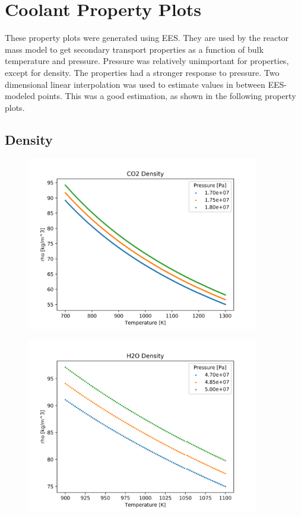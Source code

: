 \chapter{Coolant Property Plots}\label{ch:appendix-b}

These property plots were generated using EES. They are used by the reactor mass
model to get secondary transport properties as a function of bulk temperature
and pressure. Pressure was relatively unimportant for \codiox properties,
except for density. The \water properties had a stronger response to pressure.
Two dimensional linear interpolation was used to estimate values in between
EES-modeled points. This was a good estimation, as shown in the following
property plots.

\section{Density}
\begin{figure}[h]
    \centering
    \includegraphics[width=4in]{../images/property_plots/CO2_Density.png}
\end{figure}

\begin{figure}[h]
    \centering
    \includegraphics[width=4in]{../images/property_plots/H2O_Density.png}
\end{figure}

